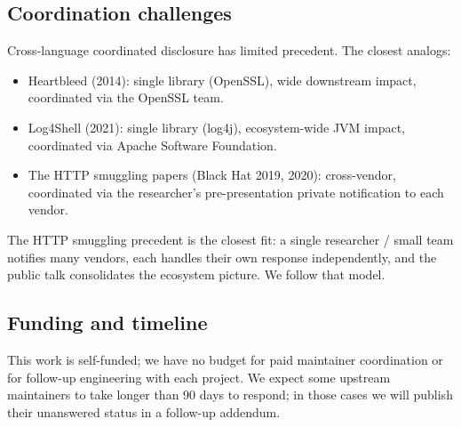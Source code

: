 \subsection{Coordination challenges}
\label{sec:disc-coord}

Cross-language coordinated disclosure has limited precedent. The
closest analogs:

\begin{itemize}
  \item Heartbleed (2014): single library (OpenSSL), wide
    downstream impact, coordinated via the OpenSSL team.
  \item Log4Shell (2021): single library (log4j), ecosystem-wide
    JVM impact, coordinated via Apache Software Foundation.
  \item The HTTP smuggling papers (Black Hat 2019, 2020):
    cross-vendor, coordinated via the researcher's pre-presentation
    private notification to each vendor.
\end{itemize}

The HTTP smuggling precedent is the closest fit: a single
researcher / small team notifies many vendors, each handles their
own response independently, and the public talk consolidates the
ecosystem picture. We follow that model.

\subsection{Funding and timeline}
\label{sec:disc-funding}

This work is self-funded; we have no budget for paid maintainer
coordination or for follow-up engineering with each project. We
expect some upstream maintainers to take longer than 90 days to
respond; in those cases we will publish their unanswered status
in a follow-up addendum.
